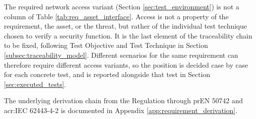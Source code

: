 The required network access variant (Section \ref{sec:test_environment}) is not a column of Table \ref{tab:req_asset_interface}. Access is not a property of the requirement, the asset, or the threat, but rather of the individual test technique chosen to verify a security function. It is the last element of the traceability chain to be fixed, following Test Objective and Test Technique in Section \ref{subsec:traceability_model}. Different scenarios for the same requirement can therefore require different access variants, so the position is decided case by case for each concrete test, and is reported alongside that test in Section \ref{sec:executed_tests}.

The underlying derivation chain from the Regulation through prEN 50742 and \gls{acr:IEC} 62443-4-2 is documented in Appendix \ref{app:requirement_derivation}.


